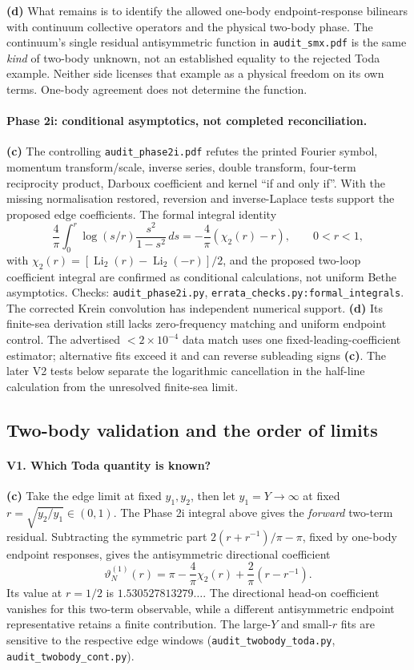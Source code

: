 \documentclass[11pt,a4paper]{article}
\newcommand{\Lc}{\textsf{\textbf{(c)}}\xspace}
\newcommand{\Ld}{\textsf{\textbf{(d)}}\xspace}
\newcommand{\file}[1]{\nolinkurl{#1}}
\theoremstyle{remark}\newtheorem{remark}[proposition]{Remark}
\begin{document}
\Ld What remains is to identify the allowed one-body endpoint-response
bilinears with continuum collective operators and the physical two-body phase.
The continuum's single residual antisymmetric function in \file{audit_smx.pdf}
is the same \emph{kind} of two-body unknown, not an established equality to
the rejected Toda example. Neither side licenses that example as a physical
freedom on its own terms. One-body agreement does not determine the function.

\paragraph{Phase 2i: conditional asymptotics, not completed reconciliation.}
\Lc The controlling \file{audit_phase2i.pdf} refutes the printed Fourier symbol,
momentum transform/scale, inverse series, double transform, four-term
reciprocity product, Darboux coefficient and kernel ``if and only if''.
With the missing normalisation restored, reversion and inverse-Laplace tests
support the proposed edge coefficients. The formal integral identity
\[
 \frac4\pi\int_0^r\log(s/r)\frac{s^2}{1-s^2}\,ds
 =-\frac4\pi(\chi_2(r)-r),\qquad 0<r<1,
\]
with $\chi_2(r)=[\operatorname{Li}_2(r)-\operatorname{Li}_2(-r)]/2$, and the proposed two-loop coefficient integral are confirmed as conditional
calculations, not uniform Bethe asymptotics. Checks:
\file{audit_phase2i.py}, \file{errata_checks.py:formal_integrals}.
The corrected Krein convolution has independent numerical support.
\Ld Its finite-sea derivation still lacks zero-frequency matching and uniform
endpoint control. The advertised $<2\times10^{-4}$ data match uses one
fixed-leading-coefficient estimator; alternative fits exceed it and can reverse
subleading signs \Lc. The later V2 tests below separate the logarithmic
cancellation in the half-line calculation from the unresolved finite-sea limit.

\subsection{Two-body validation and the order of limits}\label{sec:validation}
\paragraph{V1. Which Toda quantity is known?}
\Lc Take the edge limit at fixed $y_1,y_2$, then let $y_1=Y\to\infty$
at fixed $r=\sqrt{y_2/y_1}\in(0,1)$. The Phase 2i integral above gives
the \emph{forward} two-term residual. Subtracting the symmetric part
$2(r+r^{-1})/\pi-\pi$, fixed by one-body endpoint responses, gives the
antisymmetric directional coefficient
\[
 \vartheta_N^{(1)}(r)=\pi-\frac4\pi\chi_2(r)+\frac2\pi(r-r^{-1}).
\]
Its value at $r=1/2$ is $1.530527813279\ldots$. The directional head-on
coefficient vanishes for this two-term observable, while a different
antisymmetric endpoint representative retains a finite contribution.
The large-$Y$ and small-$r$ fits are sensitive to the respective edge
windows (\file{audit_twobody_toda.py}, \file{audit_twobody_cont.py}).
\end{document}
